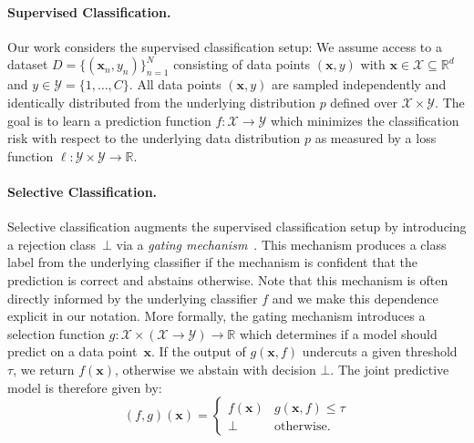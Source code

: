 \paragraph{Supervised Classification.} Our work considers the supervised classification setup: We assume access to a dataset $D = \{(\bm{x}_n,y_n)\}_{n=1}^{N}$ consisting of data points $(\bm{x},y)$ with $\bm{x} \in \mathcal{X} \subseteq \mathbb{R}^d$ and $y \in \mathcal{Y} = \{1, \ldots, C\}$. All data points $(\bm{x},y)$ are sampled independently and identically distributed from the underlying distribution $p$ defined over $\mathcal{X} \times \mathcal{Y}$. The goal is to learn a prediction function $f : \mathcal{X} \rightarrow \mathcal{Y}$ which minimizes the classification risk with respect to the underlying data distribution $p$ as measured by a loss function $\ell : \mathcal{Y} \times \mathcal{Y} \rightarrow \mathbb{R}$. 

\paragraph{Selective Classification.} Selective classification augments the supervised classification setup by introducing a rejection class~$\bot$ via a \textit{gating mechanism}~\citep{yaniv2010riskcoveragecurve}. This mechanism produces a class label from the underlying classifier if the mechanism is confident that the prediction is correct and abstains otherwise. Note that this mechanism is often directly informed by the underlying classifier $f$ and we make this dependence explicit in our notation. More formally, the gating mechanism introduces a selection function $g:\mathcal{X} \times (\mathcal{X} \rightarrow \mathcal{Y}) \rightarrow \mathbb{R}$ which determines if a model should predict on a data point~$\bm{x}$. If the output of $g(\bm{x}, f)$ undercuts a given threshold $\tau$, we return $f(\bm{x})$, otherwise we abstain with decision $\bot$. The joint predictive model is therefore given by:
\begin{equation}
    (f,g)(\bm{x}) = \begin{cases}
  f(\bm{x})  & g(\bm{x}, f) \leq \tau \\
  \bot & \text{otherwise.}
\end{cases}
\end{equation}
